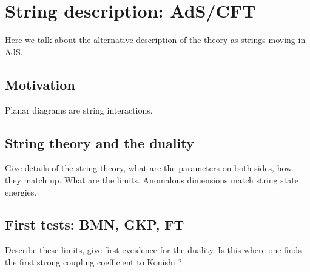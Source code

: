 
\section{String description: AdS/CFT}

Here we talk about the alternative description of the theory as strings moving in AdS.

\subsection{Motivation}

Planar diagrams are string interactions.

\subsection{String theory and the duality}

Give details of the string theory, what are the parameters on both sides, how they match up. What are the limits. Anomalous dimensions match string state energies.

\subsection{First tests: BMN, GKP, FT}

Describe these limits, give first eveidence for the duality. Is this where one finds the first strong coupling coefficient to Konishi ?
